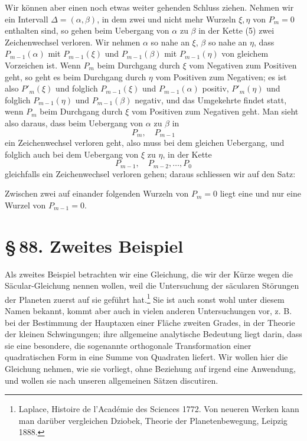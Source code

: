 \documentclass[11pt]{article}
\providecommand{\sect}[2]{\section*{\S\,#1. #2}}
\begin{document}
Wir k\"onnen aber einen noch etwas weiter gehenden Schluss ziehen. Nehmen wir ein Intervall $\Delta=(\alpha,\beta)$, in dem zwei und nicht mehr Wurzeln $\xi,\eta$ von $P_m=0$ enthalten sind, so gehen beim Uebergang von $\alpha$ zu $\beta$ in der Kette (5) zwei Zeichenwechsel verloren. Wir nehmen $\alpha$ so nahe an $\xi$, $\beta$ so nahe an $\eta$, dass $P_{m-1}(\alpha)$ mit $P_{m-1}(\xi)$ und $P_{m-1}(\beta)$ mit $P_{m-1}(\eta)$ von gleichem Vorzeichen ist. Wenn $P_m$ beim Durchgang durch $\xi$ vom Negativen zum Positiven geht, so geht es beim Durchgang durch $\eta$ vom Positiven zum Negativen; es ist also $P'_m(\xi)$ und folglich $P_{m-1}(\xi)$ und $P_{m-1}(\alpha)$ positiv, $P'_m(\eta)$ und folglich $P_{m-1}(\eta)$ und $P_{m-1}(\beta)$ negativ, und das Umgekehrte findet statt, wenn $P_m$ beim Durchgang durch $\xi$ vom Positiven zum Negativen geht. Man sieht also daraus, dass beim Uebergang von $\alpha$ zu $\beta$ in
\[
        P_m,
        \quad P_{m-1}
\]
ein Zeichenwechsel verloren geht, also muss bei dem gleichen Uebergang, und folglich auch bei dem Uebergang von $\xi$ zu $\eta$, in der Kette
\[
        P_{m-1},
        \quad P_{m-2},
        \ldots,
        P_0
\]
gleichfalls ein Zeichenwechsel verloren gehen; daraus schliessen wir auf den Satz:

Zwischen zwei auf einander folgenden Wurzeln von $P_m=0$ liegt eine und nur eine Wurzel von $P_{m-1}=0$.

\sect{88}{Zweites Beispiel}

Als zweites Beispiel betrachten wir eine Gleichung, die wir der K\"urze wegen die S\"acular-Gleichung nennen wollen, weil die Untersuchung der s\"acularen St\"orungen der Planeten zuerst auf sie gef\"uhrt hat.\footnote{Laplace, Histoire de l'Acad\'emie des Sciences 1772. Von neueren Werken kann man dar\"uber vergleichen Dziobek, Theorie der Planetenbewegung, Leipzig 1888.} Sie ist auch sonst wohl unter diesem Namen bekannt, kommt aber auch in vielen anderen Untersuchungen vor, z. B. bei der Bestimmung der Hauptaxen einer Fl\"ache zweiten Grades, in der Theorie der kleinen Schwingungen; ihre allgemeine analytische Bedeutung liegt darin, dass sie eine besondere, die sogenannte orthogonale Transformation einer quadratischen Form in eine Summe von Quadraten liefert. Wir wollen hier die Gleichung nehmen, wie sie vorliegt, ohne Beziehung auf irgend eine Anwendung, und wollen sie nach unseren allgemeinen S\"atzen discutiren.
\end{document}
